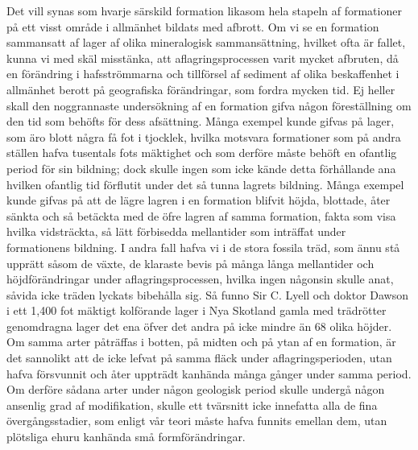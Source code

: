 Det vill synas som hvarje särskild formation likasom hela stapeln af formationer på ett visst område i allmänhet bildats med afbrott. Om vi se en formation sammansatt af lager af olika mineralogisk sammansättning, hvilket ofta är fallet, kunna vi med skäl misstänka, att aflagringsprocessen varit mycket afbruten, då en förändring i hafsströmmarna och tillförsel af sediment af olika beskaffenhet i allmänhet berott på geografiska förändringar, som fordra mycken tid. Ej heller skall den noggrannaste undersökning af en formation gifva någon föreställning om den tid som behöfts för dess afsättning. Många exempel kunde gifvas på lager, som äro blott några få fot i tjocklek, hvilka motsvara formationer som på andra ställen hafva tusentals fots mäktighet och som derföre måste behöft en ofantlig period för sin bildning; dock skulle ingen som icke kände detta förhållande ana hvilken ofantlig tid förflutit under det så tunna lagrets bildning. Många exempel kunde gifvas på att de lägre lagren i en formation blifvit höjda, blottade, åter sänkta och så betäckta med de öfre lagren af samma formation, fakta som visa hvilka vidsträckta, så lätt förbisedda mellantider som inträffat under formationens bildning. I andra fall hafva vi i de stora fossila träd, som ännu stå upprätt såsom de växte, de klaraste bevis på många långa mellantider och höjdförändringar under aflagringsprocessen, hvilka ingen någonsin skulle anat, såvida icke träden lyckats bibehålla sig. Så funno Sir C. Lyell och doktor Dawson i ett 1,400 fot mäktigt kolförande lager i Nya Skotland gamla med trädrötter genomdragna lager det ena öfver det andra på icke mindre än 68 olika höjder. Om samma arter påträffas i botten, på midten och på ytan af en formation, är det sannolikt att de icke lefvat på samma fläck under aflagringsperioden, utan hafva försvunnit och åter uppträdt kanhända många gånger under samma period. Om derföre sådana arter under någon geologisk period skulle undergå någon ansenlig grad af modifikation, skulle ett tvärsnitt icke innefatta alla de fina övergångsstadier, som enligt vår teori måste hafva funnits emellan dem, utan plötsliga ehuru kanhända små formförändringar.

